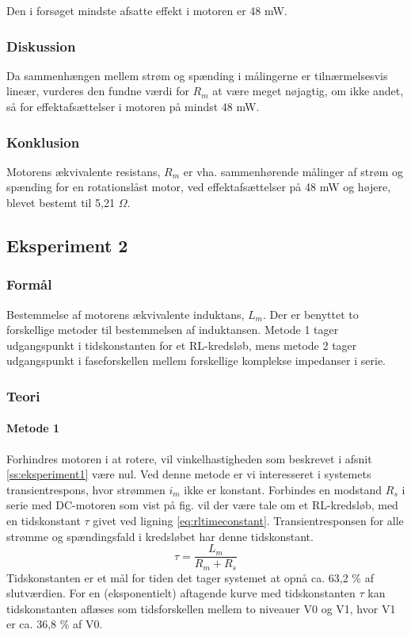 Den i forsøget mindste afsatte effekt i motoren er 48 mW.
\subsubsection{Diskussion}
Da sammenhængen mellem strøm og spænding i målingerne er tilnærmelsesvis lineær,
vurderes den fundne værdi for $R_m$ at være meget nøjagtig,
om ikke andet, så for effektafsættelser i motoren på mindst 48 mW.
\subsubsection{Konklusion}
Motorens ækvivalente resistans, $R_m$ er vha. sammenhørende målinger af strøm og spænding
for en rotationslåst motor, ved effektafsættelser på 48 mW og højere,
blevet bestemt til 5,21 $\Omega$.
\subsection{Eksperiment 2}
\subsubsection{Formål}
Bestemmelse af motorens ækvivalente induktans, $L_m$.
Der er benyttet to forskellige metoder til bestemmelsen af induktansen.
Metode 1 tager udgangspunkt i tidskonstanten for et RL-kredsløb,
mens metode 2 tager udgangspunkt i faseforskellen mellem forskellige komplekse impedanser i serie.
\subsubsection{Teori}
\paragraph{Metode 1}
Forhindres motoren i at rotere, vil vinkelhastigheden som beskrevet i afsnit \ref{ss:eksperiment1} være nul.
Ved denne metode er vi interesseret i systemets transientrespons, hvor strømmen $i_m$ ikke er konstant.
Forbindes en modstand $R_s$ i serie med DC-motoren som vist på fig. %
vil der være tale om et RL-kredsløb, med en tidskonstant $\tau$ givet ved ligning \ref{eq:rltimeconstant}.
Transientresponsen for alle strømme og spændingsfald i kredsløbet har denne tidskonstant.
\begin{equation}
	\tau=\frac{L_m}{R_m+R_s}
	\label{eq:rltimeconstant} 
 \end{equation}
Tidskonstanten er et mål for tiden det tager systemet at opnå ca. 63,2 \% af slutværdien.
For en (eksponentielt) aftagende kurve med tidskonstanten $\tau$ kan tidskonstanten aflæses som
tidsforskellen mellem to niveauer V0 og V1, hvor V1 er ca. 36,8 \% af V0.

